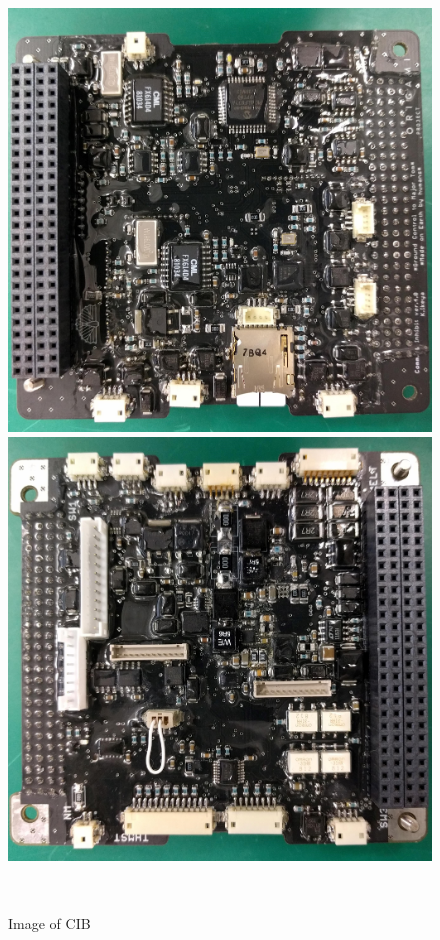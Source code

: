 \begin{figure}[htbp]
	\begin{minipage}{0.5\hsize}
		\begin{center}
			\includegraphics[width=0.7\linewidth]{./03/fig/CIB_1.jpg}
		\end{center}
	\end{minipage}
	\begin{minipage}{0.5\hsize}
		\begin{center}
			\includegraphics[width=0.7\linewidth]{./03/fig/CIB_2.jpg}
		\end{center}
	\end{minipage}\\		
	\begin{center}
		\caption{Image of CIB}
	\end{center}
	\label{fig3-1cib}
\end{figure}


